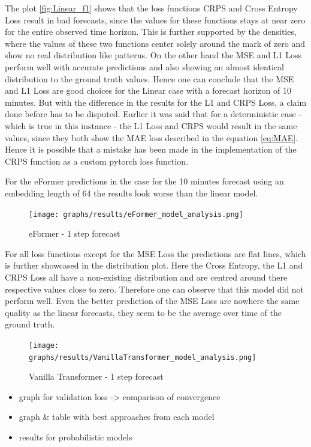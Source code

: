 \documentclass{article}
\begin{document}
The plot \ref{fig:Linear_f1} shows that the loss functions CRPS and Cross Entropy Loss result in bad forecasts, since the values for these functions stays at near zero for the entire observed time horizon. This is further supported by the densities, where the values of these two functions center solely around the mark of zero and show no real distribution like patterns. On the other hand the MSE and L1 Loss perform well with accurate predictions and also showing an almost identical distribution to the ground truth values. Hence one can conclude that the MSE and L1 Loss are good choices for the Linear case with a forecast horizon of 10 minutes. But with the difference in the results for the L1 and CRPS Loss, a claim done before has to be disputed. Earlier it was said that for a deterministic case - which is true in this instance - the L1 Loss and CRPS would result in the same values, since they both show the MAE loss described in the equation \ref{eq:MAE}. Hence it is possible that a mistake has been made in the implementation of the CRPS function as a custom pytorch loss function. \par 
For the eFormer predictions in the case for the 10 minutes forecast using an embedding length of 64 the results look worse than the linear model.

\begin{figure}
    \centering
    \texttt{[image: graphs/results/eFormer\_model\_analysis.png]}
    \caption{eFormer - 1 step forecast}
    \label{fig:eFormer_f1_emb64}
\end{figure}

For all loss functions except for the MSE Loss the predictions are flat lines, which is further showcased in the distribution plot. Here the Cross Entropy, the L1 and CRPS Loss all have a non-existing distribution and are centred around there respective values close to zero. Therefore one can observe that this model did not perform well. Even the better prediction of the MSE Loss are nowhere the same quality as the linear forecasts, they seem to be the average over time of the ground truth. \par 

\begin{figure}
    \centering
    \texttt{[image: graphs/results/VanillaTransformer\_model\_analysis.png]}
    \caption{Vanilla Transformer - 1 step forecast}
    \label{fig:vanillatransformer_f1_emb64}
\end{figure}

\begin{itemize}
    \item graph for validation loss -> comparison of convergence
    \item graph \& table with best approaches from each model
    \item results for probabilistic models
\end{itemize}
\end{document}
